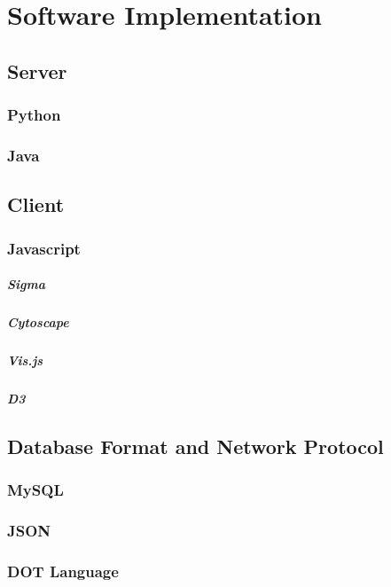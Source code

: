 \chapter{Software Implementation}

\section{Server}

\subsection{Python}

\subsection{Java}

\section{Client}

\subsection{Javascript}

\paragraph{Sigma}

\paragraph{Cytoscape}

\paragraph{Vis.js}

\paragraph{D3}

\section{Database Format and Network Protocol}

\subsection{MySQL}

\subsection{JSON}

\subsection{DOT Language}
